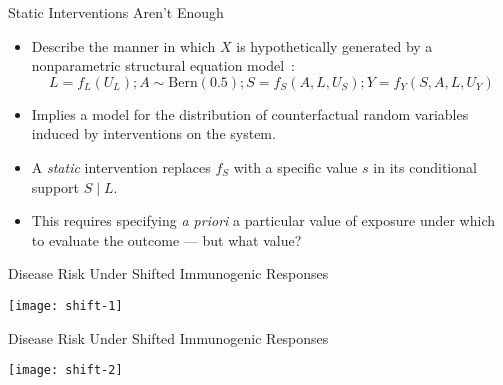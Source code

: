 \documentclass{beamer}
\begin{document}
\begin{frame}[c]{Static Interventions Aren't Enough}

\begin{center}
\begin{itemize}
  \itemsep8pt
  \item Describe the manner in which $X$ is hypothetically generated by a
    nonparametric structural equation model~\citep{pearl2009causality}:
    \begin{equation*}
      L = f_L(U_L); A \sim \text{Bern}(0.5);
      S = f_S(A, L, U_S); Y = f_Y(S, A, L, U_Y)
    \end{equation*}
  \item Implies a model for the distribution of counterfactual random variables
    induced by interventions on the system.
  \item A \textit{static} intervention replaces $f_S$ with a specific value $s$
    in its conditional support $S \mid L$.
  \item This requires specifying \textit{a priori} a particular value of
    exposure under which to evaluate the outcome --- but what value?
\end{itemize}
\end{center}

\note{
}

\end{frame}


\begin{frame}[c]{Disease Risk Under Shifted Immunogenic Responses}

\hspace*{-1cm}\texttt{[image: shift-1]}

\note{
}

\end{frame}


\begin{frame}[c]{Disease Risk Under Shifted Immunogenic Responses}

\hspace*{-1cm}\texttt{[image: shift-2]}

\note{
}

\end{frame}

\end{document}
